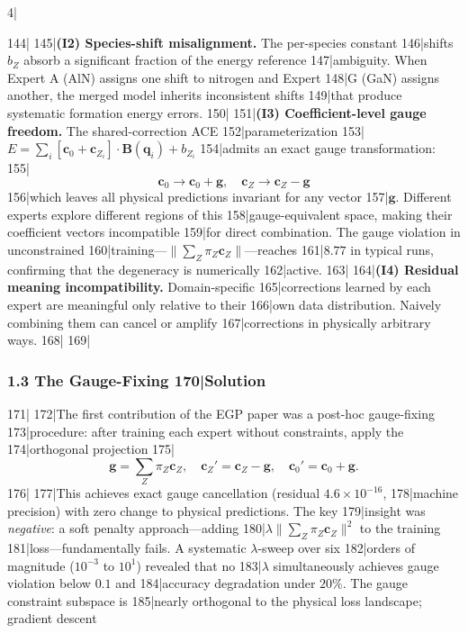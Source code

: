4|\documentclass[
5|  12pt,
6|]{ctexart}
\begin{document}
144|
145|\textbf{(I2) Species-shift misalignment.} The per-species constant
146|shifts \(b_Z\) absorb a significant fraction of the energy reference
147|ambiguity. When Expert A (AlN) assigns one shift to nitrogen and Expert
148|G (GaN) assigns another, the merged model inherits inconsistent shifts
149|that produce systematic formation energy errors.
150|
151|\textbf{(I3) Coefficient-level gauge freedom.} The shared-correction ACE
152|parameterization
153|\(E = \sum_i [{\mathbf{c}}_0 + {\mathbf{c}}_{Z_i}] \cdot {\mathbf{B}}({\mathbf{q}}_i) + b_{Z_i}\)
154|admits an exact gauge transformation:
155|\[{\mathbf{c}}_0 \to {\mathbf{c}}_0 + {\mathbf{g}}, \quad {\mathbf{c}}_Z \to {\mathbf{c}}_Z - {\mathbf{g}}\]
156|which leaves all physical predictions invariant for any vector
157|\({\mathbf{g}}\). Different experts explore different regions of this
158|gauge-equivalent space, making their coefficient vectors incompatible
159|for direct combination. The gauge violation in unconstrained
160|training---\(\lVert\sum_Z \pi_Z {\mathbf{c}}_Z\rVert\)---reaches
161|\(8.77\) in typical runs, confirming that the degeneracy is numerically
162|active.
163|
164|\textbf{(I4) Residual meaning incompatibility.} Domain-specific
165|corrections learned by each expert are meaningful only relative to their
166|own data distribution. Naively combining them can cancel or amplify
167|corrections in physically arbitrary ways.
168|
169|\subsubsection{1.3 The Gauge-Fixing
170|Solution}\label{the-gauge-fixing-solution}
171|
172|The first contribution of the EGP paper was a post-hoc gauge-fixing
173|procedure: after training each expert without constraints, apply the
174|orthogonal projection
175|\[{\mathbf{g}} = \sum_Z \pi_Z {\mathbf{c}}_Z, \quad {\mathbf{c}}_Z' = {\mathbf{c}}_Z - {\mathbf{g}}, \quad {\mathbf{c}}_0' = {\mathbf{c}}_0 + {\mathbf{g}}.\]
176|
177|This achieves exact gauge cancellation (residual \(4.6\times10^{-16}\),
178|machine precision) with zero change to physical predictions. The key
179|insight was \emph{negative}: a soft penalty approach---adding
180|\(\lambda\lVert\sum_Z\pi_Z{\mathbf{c}}_Z\rVert^2\) to the training
181|loss---fundamentally fails. A systematic \(\lambda\)-sweep over six
182|orders of magnitude (\(10^{-3}\) to \(10^1\)) revealed that no
183|\(\lambda\) simultaneously achieves gauge violation below \(0.1\) and
184|accuracy degradation under \(20\%\). The gauge constraint subspace is
185|nearly orthogonal to the physical loss landscape; gradient descent
\end{document}
